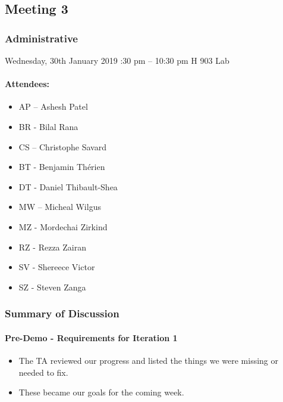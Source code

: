 \documentclass[10pt, a4paper]{article}
\begin{document}
			\subsection{Meeting 3}
			
			\subsubsection{Administrative}
			Wednesday, 30th January 2019 :30 pm – 10:30 pm \textbar H 903 Lab 
			\paragraph{Attendees:}
			
			\begin{itemize}
				\item AP – Ashesh Patel
				\item BR - Bilal Rana
				\item CS – Christophe Savard 
				\item BT - Benjamin Th\'erien
				\item DT - Daniel Thibault-Shea
				\item MW – Micheal Wilgus
				\item MZ - Mordechai Zirkind  
				\item RZ - Rezza Zairan 
				\item SV - Shereece Victor 
				\item SZ - Steven Zanga
				
			\end{itemize}
			
			\subsubsection{Summary of Discussion }
			\paragraph{Pre-Demo - Requirements for Iteration 1}
			\begin{itemize}
				\item The TA reviewed our progress and listed the things we were missing or needed to fix.
				\item These became our goals for the coming week. 
				
			\end{itemize}
			
\end{document}
